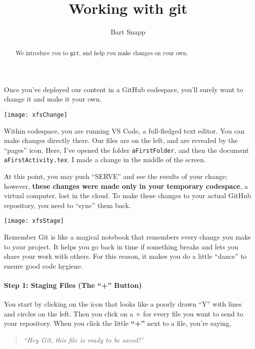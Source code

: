 \documentclass{ximera}
\author{Bart Snapp}
\title{Working with git}
\begin{document}
\pdfOnly{\onecolumn}
\begin{abstract}
    We introduce you to \texttt{git}, and help you make changes on your own.
\end{abstract}
\maketitle
Once you've deployed our content in a GitHub codespace, you'll surely want to
change it and  make it your own.
\begin{image}
    \texttt{[image: xfsChange]}
\end{image}
    Within codespace, you are running VS Code, a
    full-fledged text editor. You can make changes directly there. Our files
    are on
    the left, and are revealed by the ``pages'' icon.
    Here, I've opened the folder \verb!aFirstFolder!, and then the document
    \verb!aFirstActivity.tex!. I made a change in the middle of the screen.

    At this point, you may push ``SERVE'' and see the results of your change;
    however, \textbf{these changes were made only in your temporary codespace},
    a
    virtual
    computer, lost in the cloud. To make these changes to your actual GitHub
    repository, you need to ``sync'' them back.
\pdfOnly{\end{multicols}}

\newpage

\begin{image}
    \texttt{[image: xfsStage]}
\end{image}

    Remember Git is like a magical notebook that remembers every change you
    make to your
    project. It helps you go back in time if something breaks and lets you
    share
    your work with others. For this reason, it makes you do a little ``dance''
    to ensure good code hygiene.

    \paragraph{Step 1: Staging Files (The ``+'' Button)}

    You start by clicking on the icon that looks like a poorly drawn ``Y'' with
    lines and circles on the left. Then you click on a $+$ for every file you
    want
    to send to your repository.  When you click the little \textbf{``+''} next
    to a
    file, you're saying,
    \begin{quote}
        \emph{``Hey Git, this file is ready to be saved!''}
    \end{quote}
\end{document}
